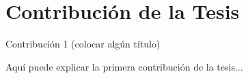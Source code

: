 \section{Contribuci\'{o}n de la Tesis}

\begin{contribution}{Contribuci\'{o}n 1 (colocar alg\'{u}n t\'{i}tulo)}

Aqu\'{i} puede explicar la primera contribuci\'{o}n de la tesis...
 
\end{contribution}